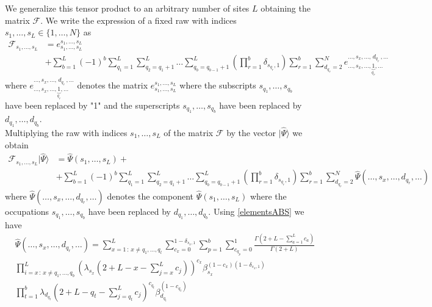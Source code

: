 \documentclass[11pt]{article}
\numberwithin{equation}{section}
\numberwithin{equation}{subsection}
\begin{document}
We generalize this tensor product to an arbitrary number of sites $L$ obtaining the matrix $\mathcal{F}$. We write the expression of a fixed raw with indices $s_{1},\ldots,s_{L}\in \{1,\ldots,N\}$ as 
\begin{equation}
    \begin{split}
        \mathcal{F}_{s_{1},\ldots,s_{L}}&=e_{s_{1},\ldots,s_{L}}^{s_{1},\ldots,s_{L}}
        \\&
        +\sum_{b=1}^{L}(-1)^{b}\sum_{q_{1}=1}^{L}\sum_{q_{2}=q_{1}+1}^{L}\ldots\sum_{q_{b}=q_{b-1}+1}^{L}\left(\prod_{r=1}^{b}\delta_{s_{q_{r}},1}\right)\sum_{r=1}^{b}\sum_{d_{q_{r}}=2}^{N}e_{\ldots,s_{x},\ldots,\underbrace{1}_{q_{r}},\ldots}^{\ldots,s_{x},\ldots,\,d_{q_{r}}\,,\ldots}
    \end{split}
\end{equation}
where $e_{\ldots,s_{x},\ldots,\underbrace{1}_{q_{r}},\ldots}^{\ldots,s_{x},\ldots,\,d_{q_{r}}\,,\ldots}$ denotes the matrix $e_{s_{1},\ldots,s_{L}}^{s_{1},\ldots,s_{L}}$ where the subscripts $s_{q_{1}},\ldots,s_{q_{b}}$ have been replaced by "1" and the superscripts $s_{q_{1}},\ldots,s_{q_{b}}$ have been replaced by $d_{q_{1}},\ldots,d_{q_{b}}$. \\
Multiplying the raw with indices $s_{1},\ldots,s_{L}$ of the matrix $\mathcal{F}$ by the vector $|\widehat{\Psi}\rangle$ we obtain 
\begin{equation}
    \begin{split}
        \mathcal{F}_{s_{1},\ldots,s_{L}}|\widehat{\Psi}\rangle&=\widehat{\Psi}(s_{1},\ldots,s_{L})+ 
        \\&
        +\sum_{b=1}^{L}(-1)^{b}\sum_{q_{1}=1}^{L}\sum_{q_{2}=q_{1}+1}^{L}\ldots\sum_{q_{b}=q_{b-1}+1}^{L}\left(\prod_{r=1}^{b}\delta_{s_{q_{r}},1}\right)\sum_{r=1}^{b}\sum_{d_{q_{r}}=2}^{N}\widehat{\Psi}(\ldots,s_{x},\ldots,d_{q_{r}},\ldots)
    \end{split}
\end{equation}
where $\widehat{\Psi}(\ldots,s_{x},\ldots,d_{q_{r}},\ldots)$ denotes the component $\widehat{\Psi}(s_{1},\ldots,s_{L})$ where the occupations  $s_{q_{1}},\ldots,s_{q_{b}}$ have been replaced by $d_{q_{1}},\ldots,d_{q_{b}}$. Using \eqref{elementsABS} we have 
\begin{equation}
    \begin{split}
  &\widehat{\Psi}(\ldots,s_{x},\ldots,d_{q_{r}},\ldots)=\sum_{x=1\,:\, x\neq q_{1},\ldots,q_{l}}^{L}\sum_{c_{x}=0}^{1-\delta_{s_{x},1}}\sum_{p=1}^{b}\sum_{c_{q_{p}}=0}^{1}\frac{\Gamma(2+L-\sum_{a=1}^{L}c_{a})}{\Gamma(2+L)}
\\&  
\prod_{i=x\,:\, x\neq q_{1},\ldots,q_{b}}^{L}\left(\lambda_{s_{x}}\left(2+L-x-\sum_{j=x}^{L}c_{j}\right)\right)^{c_{x}}\beta_{s_{x}}^{(1-c_{x})(1-\delta_{s_{x},1})}
\\&
  \prod_{t=1}^{b}\lambda_{d_{q_{t}}}\left(2+L-q_{t}-\sum_{j=q_{t}}^{L}c_{j}\right)^{c_{q_{t}}}\beta_{d_{q_{t}}}^{(1-c_{q_{t}})}
    \end{split}
\end{equation}
\end{document}
